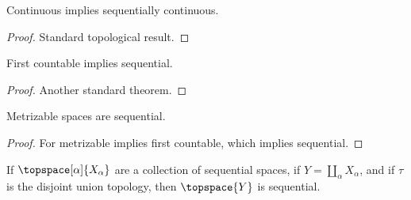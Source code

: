 \documentclass{book}                                                           %
\begin{document}
                    \begin{theorem}
                        Continuous implies sequentially continuous.
                    \end{theorem}
                    \begin{proof}
                        Standard topological result.
                    \end{proof}
                    \begin{theorem}
                        First countable implies sequential.
                    \end{theorem}
                    \begin{proof}
                        Another standard theorem.
                    \end{proof}
                    \begin{theorem}
                        Metrizable spaces are sequential.
                    \end{theorem}
                    \begin{proof}
                        For metrizable implies first countable, which implies
                        sequential.
                    \end{proof}
                    \begin{theorem}
                        If $\topspace[\alpha]{X_{\alpha}}$ are a collection of
                        sequential spaces, if $Y=\coprod_{\alpha}X_{\alpha}$,
                        and if $\tau$ is the disjoint union topology, then
                        $\topspace{Y}$ is sequential.
                    \end{theorem}
\end{document}
